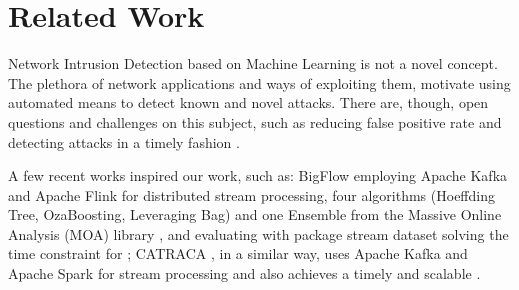 
\section{Related Work}
\label{sec:related}

Network Intrusion Detection based on Machine Learning is not a novel concept.
The plethora of network applications and 
ways of exploiting them, motivate using automated means to detect known and novel attacks. 
There are, though, open questions and challenges on this subject, such as
reducing false positive rate and detecting attacks in a timely fashion \cite{DaCosta2019a}.

A few recent works inspired our work, such as: BigFlow \cite{Viegas2019}
employing Apache Kafka and Apache Flink for distributed stream processing,
four algorithms (Hoeffding Tree, OzaBoosting, Leveraging Bag) and one Ensemble
from the Massive Online Analysis (MOA) library \cite{MOA}, and
evaluating with package stream dataset solving the time constraint for \nids;
CATRACA \cite{AndreoniLopez2018,AndreoniLopez2019}, in a similar way, uses 
Apache Kafka and Apache Spark for stream processing and also achieves
a timely and scalable \nids.


